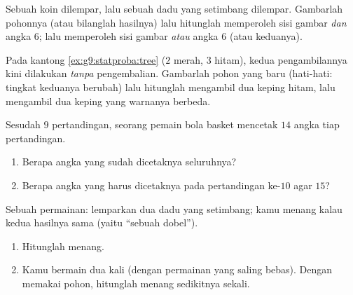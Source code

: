 \begin{exercise}[$\star\star$]\label{exo:g9:statproba:6}
Sebuah koin dilempar, lalu sebuah dadu yang setimbang dilempar.
Gambarlah pohonnya (atau bilanglah hasilnya) lalu hitunglah 
memperoleh sisi gambar \emph{dan} angka $6$; lalu  memperoleh
sisi gambar \emph{atau} angka $6$ (atau keduanya).
\end{exercise}

\begin{exercise}[$\star\star$]\label{exo:g9:statproba:7}
Pada kantong \cref{ex:g9:statproba:tree} ($2$ merah, $3$ hitam), kedua
pengambilannya kini dilakukan \emph{tanpa} pengembalian. Gambarlah
pohon yang baru (hati-hati:  tingkat keduanya berubah) lalu
hitunglah  mengambil dua keping hitam, lalu  mengambil
dua keping yang warnanya berbeda.
\end{exercise}

\begin{exercise}[$\star\star$]\label{exo:g9:statproba:8}
Sesudah $9$ pertandingan, seorang pemain bola basket 
mencetak $14$ angka tiap pertandingan.
\begin{enumerate}
  \item Berapa angka yang sudah dicetaknya seluruhnya?
  \item Berapa angka yang harus dicetaknya pada pertandingan ke-$10$
        agar  $15$?
\end{enumerate}
\end{exercise}

\begin{exercise}[$\star\star\star$]\label{exo:g9:statproba:9}
Sebuah permainan: lemparkan dua dadu yang setimbang; kamu menang kalau
kedua hasilnya sama (yaitu ``sebuah dobel'').
\begin{enumerate}
  \item Hitunglah  menang.
  \item Kamu bermain dua kali (dengan permainan yang saling bebas).
        Dengan memakai pohon, hitunglah  menang sedikitnya
        sekali.
\end{enumerate}
\end{exercise}

